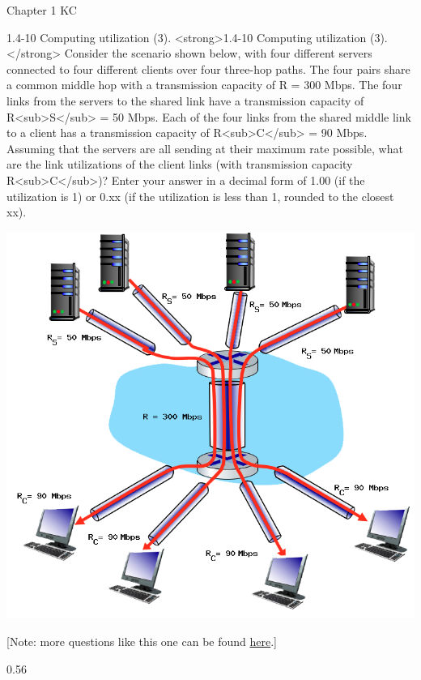 \documentclass[a4paper]{article}
\begin{document}
\begin{quiz}{Chapter 1 KC}
\begin{shortanswer}[points=1]{1.4-10 Computing utilization (3).}
<strong>1.4-10 Computing utilization (3).</strong> Consider the scenario shown below, with four different servers connected to four different clients over four three-hop paths. The four pairs share a common middle hop with a transmission capacity of R = 300 Mbps. The four links from the servers to the shared link have a transmission capacity of R<sub>S</sub> = 50 Mbps. Each of the four links from the shared middle link to a client has a transmission capacity of R<sub>C</sub> = 90 Mbps. Assuming that the servers are all sending at their maximum rate possible, what are the link utilizations of the client links (with transmission capacity R<sub>C</sub>)? Enter your answer in a decimal form of 1.00 (if the utilization is 1) or 0.xx (if the utilization is less than 1, rounded to the closest xx). 
\begin{center}
\includegraphics[width=\linewidth]{figs/1.4.7.png}
\end{center}
 [Note: more questions like this one can be found \href{http://gaia.cs.umass.edu/kurose_ross/interactive/end-end-throughput-simple.php}{here}.]
\item* 0.56
\item *
\end{shortanswer}

\end{quiz}
\end{document}
